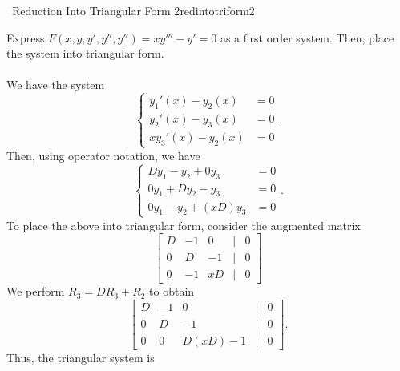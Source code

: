         \begin{example}{\Difficulty\,\Difficulty\,\,Reduction Into Triangular Form 2}{redintotriform2}

            Express \(F(x,y,y',y'',y'')=xy'''-y'=0\) as a first order system. Then, place the system into triangular form.
            \\
            \\
            We have the system
            \begin{equation*}
                \begin{cases}
                    y_1'(x)-y_2(x)&=0 \\
                    y_2'(x)-y_3(x)&=0 \\
                    xy_3'(x)-y_2(x)&=0
                \end{cases}.
            \end{equation*}
            Then, using operator notation, we have
            \begin{equation*}
                \begin{cases}
                    Dy_1-y_2+0y_3&=0 \\
                    0y_1+Dy_2-y_3&=0 \\
                    0y_1-y_2+(xD)y_3&=0
                \end{cases}.
            \end{equation*}
            To place the above into triangular form, consider the augmented matrix
            \begin{equation*}
                \begin{bmatrix}
                    D & -1 & 0 & | & 0 \\
                    0 & D & -1 & | & 0 \\
                    0 & -1 & xD & | & 0
                \end{bmatrix}
            \end{equation*}
            We perform \(R_3=DR_3+R_2\) to obtain
            \begin{equation*}
                \begin{bmatrix}
                    D & -1 & 0 & | & 0 \\
                    0 & D & -1 & | & 0 \\
                    0 & 0 & D(xD)-1 & | & 0
                \end{bmatrix}.
            \end{equation*}
            Thus, the triangular system is

\end{example}
